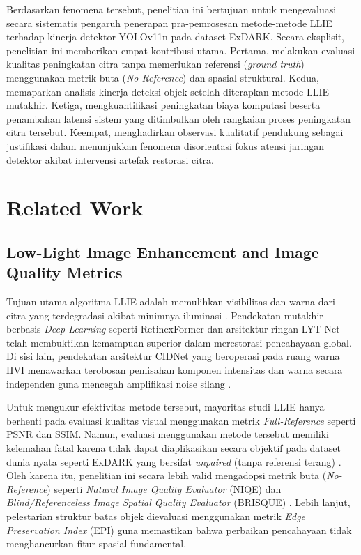 \documentclass[conference]{IEEEtran}
\begin{document}
Berdasarkan fenomena tersebut, penelitian ini bertujuan untuk mengevaluasi secara sistematis pengaruh penerapan pra-pemrosesan metode-metode LLIE terhadap kinerja detektor YOLOv11n pada dataset ExDARK. Secara eksplisit, penelitian ini memberikan empat kontribusi utama. Pertama, melakukan evaluasi kualitas peningkatan citra tanpa memerlukan referensi (\textit{ground truth}) menggunakan metrik buta (\textit{No-Reference}) dan spasial struktural. Kedua, memaparkan analisis kinerja deteksi objek setelah diterapkan metode LLIE mutakhir. Ketiga, mengkuantifikasi peningkatan biaya komputasi beserta penambahan latensi sistem yang ditimbulkan oleh rangkaian proses peningkatan citra tersebut. Keempat, menghadirkan observasi kualitatif pendukung sebagai justifikasi dalam menunjukkan fenomena disorientasi fokus atensi jaringan detektor akibat intervensi artefak restorasi citra.




\section{Related Work} 
\subsection{Low-Light Image Enhancement and Image Quality Metrics} 
Tujuan utama algoritma LLIE adalah memulihkan visibilitas dan warna dari citra yang terdegradasi akibat minimnya iluminasi \cite{liu2021benchmark}. Pendekatan mutakhir berbasis \textit{Deep Learning} seperti RetinexFormer \cite{cai2023retinexformer} dan arsitektur ringan LYT-Net \cite{brateanu2025lytnet} telah membuktikan kemampuan superior dalam merestorasi pencahayaan global. Di sisi lain, pendekatan arsitektur CIDNet yang beroperasi pada ruang warna HVI menawarkan terobosan pemisahan komponen intensitas dan warna secara independen guna mencegah amplifikasi noise silang \cite{yan2025hvi}.

Untuk mengukur efektivitas metode tersebut, mayoritas studi LLIE hanya berhenti pada evaluasi kualitas visual menggunakan metrik \textit{Full-Reference} seperti PSNR dan SSIM. Namun, evaluasi menggunakan metode tersebut memiliki kelemahan fatal karena tidak dapat diaplikasikan secara objektif pada dataset dunia nyata seperti ExDARK yang bersifat \textit{unpaired} (tanpa referensi terang) \cite{loh2019exdark,liu2021benchmark}. Oleh karena itu, penelitian ini secara lebih valid mengadopsi metrik buta (\textit{No-Reference}) seperti \textit{Natural Image Quality Evaluator} (NIQE) \cite{mittal2013niqe} dan \textit{Blind/Referenceless Image Spatial Quality Evaluator} (BRISQUE) \cite{mittal2012brisque}. Lebih lanjut, pelestarian struktur batas objek dievaluasi menggunakan metrik \textit{Edge Preservation Index} (EPI) guna memastikan bahwa perbaikan pencahayaan tidak menghancurkan fitur spasial fundamental.
\end{document}
